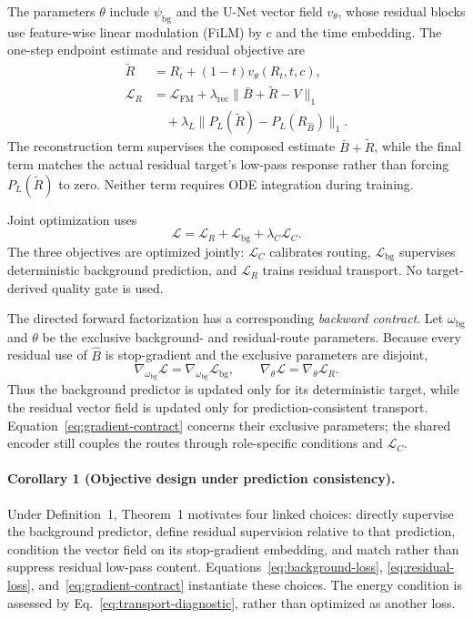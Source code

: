 The parameters $\theta$ include $\psi_{\mathrm{bg}}$ and the U-Net vector field $v_\theta$, whose residual blocks use feature-wise linear modulation (FiLM) \cite{perez2018film} by $c$ and the time embedding. The one-step endpoint estimate and residual objective are
\begin{equation}
\begin{aligned}
\widetilde R
&=R_t+(1-t)v_\theta(R_t,t,c),\\
\mathcal L_R
&=\mathcal L_{\mathrm{FM}}
+\lambda_{\mathrm{rec}}\|\bar B+\widetilde R-V\|_1\\
&\quad+\lambda_{L}\|P_L(\widetilde R)-P_L(R_{\hat B})\|_1.
\end{aligned}
\label{eq:residual-loss}
\end{equation}
The reconstruction term supervises the composed estimate $\bar B+\widetilde R$, while the final term matches the actual residual target's low-pass response rather than forcing $P_L(\widetilde R)$ to zero. Neither term requires ODE integration during training.

Joint optimization uses
\begin{equation}
\mathcal L=\mathcal L_R+\mathcal L_{\mathrm{bg}}+\lambda_C\mathcal L_C.
\label{eq:total-loss}
\end{equation}
The three objectives are optimized jointly: $\mathcal L_C$ calibrates routing, $\mathcal L_{\mathrm{bg}}$ supervises deterministic background prediction, and $\mathcal L_R$ trains residual transport. No target-derived quality gate is used.

The directed forward factorization has a corresponding \emph{backward contract}. Let $\omega_{\mathrm{bg}}$ and $\theta$ be the exclusive background- and residual-route parameters. Because every residual use of $\hat B$ is stop-gradient and the exclusive parameters are disjoint,
\begin{equation}
\nabla_{\omega_{\mathrm{bg}}}\mathcal L=\nabla_{\omega_{\mathrm{bg}}}\mathcal L_{\mathrm{bg}},
\qquad
\nabla_{\theta}\mathcal L=\nabla_{\theta}\mathcal L_R.
\label{eq:gradient-contract}
\end{equation}
Thus the background predictor is updated only for its deterministic target, while the residual vector field is updated only for prediction-consistent transport. Equation~\ref{eq:gradient-contract} concerns their exclusive parameters; the shared encoder still couples the routes through role-specific conditions and $\mathcal L_C$.

\paragraph{Corollary 1 (Objective design under prediction consistency).}
Under Definition~1, Theorem~1 motivates four linked choices: directly supervise the background predictor, define residual supervision relative to that prediction, condition the vector field on its stop-gradient embedding, and match rather than suppress residual low-pass content. Equations~\ref{eq:background-loss}, \ref{eq:residual-loss}, and~\ref{eq:gradient-contract} instantiate these choices. The energy condition is assessed by Eq.~\ref{eq:transport-diagnostic}, rather than optimized as another loss.

